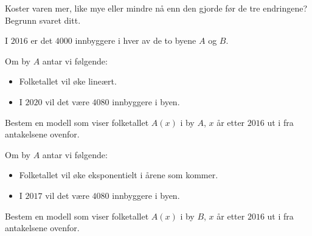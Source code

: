 Koster varen mer, like mye eller mindre nå enn den gjorde før de tre endringene?
Begrunn svaret ditt.


\Oppgave[3]

I $2016$ er det $\num{4000}$ innbyggere i hver av de to byene $A$ og $B$.
\bigskip

Om by $A$ antar vi følgende:
%
\begin{itemize}
  \item Folketallet vil øke lineært.
  \item I $2020$ vil det være $\num{4080}$ innbyggere i byen.
\end{itemize}

\begin{oppgaver}
   Bestem en modell som viser folketallet $A(x)$ i by $A$, $x$ år
    etter $2016$ ut i fra antakelsene ovenfor.
\end{oppgaver}

Om by $A$ antar vi følgende:
%
\begin{itemize}
  \item Folketallet vil øke eksponentielt i årene som kommer.
    \item I $2017$ vil det være $\num{4080}$ innbyggere i byen.
\end{itemize}

\begin{oppgaver}
   Bestem en modell som viser folketallet $A(x)$ i by $B$, $x$ år
    etter $2016$ ut i fra antakelsene ovenfor.
\end{oppgaver}

